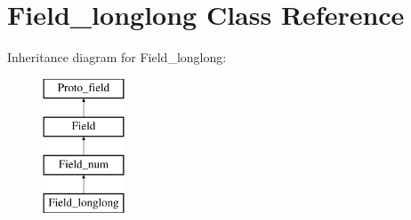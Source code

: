 \hypertarget{classField__longlong}{}\section{Field\+\_\+longlong Class Reference}
\label{classField__longlong}
Inheritance diagram for Field\+\_\+longlong\+:\begin{figure}[H]
\begin{center}
\leavevmode
\includegraphics[height=4.000000cm]{classField__longlong}
\end{center}
\end{figure}
